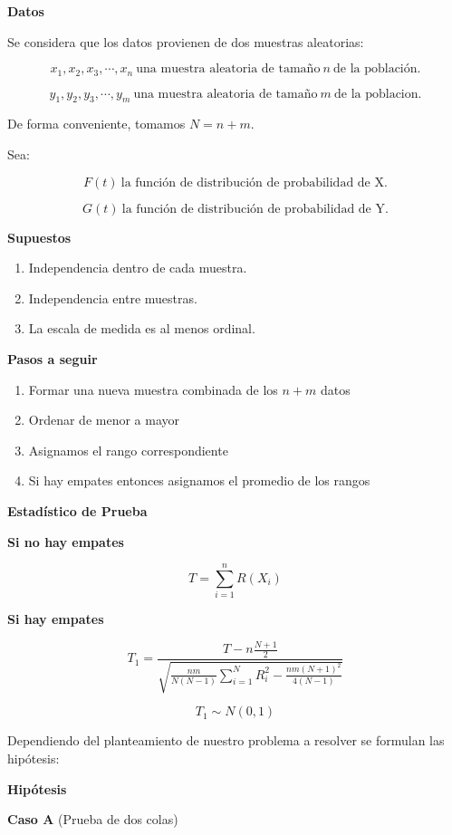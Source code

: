 \documentclass[
  a4paper,
  oneside,
  openany]{book}
\begin{document}
\textbf{Datos}

Se considera que los datos provienen de dos muestras aleatorias:

\[x_{1},x_{2},x_{3},\cdots,x_{n} \ \mbox{una muestra aleatoria de tamaño} \ n \ \mbox{de la población.}\]

\[y_{1},y_{2},y_{3},\cdots,y_{m} \ \mbox{una muestra aleatoria de tamaño} \  m \  \mbox{de la poblacion.}\]

De forma conveniente, tomamos \(N=n+m\).

Sea:

\[F(t) \ \mbox{la función de distribución de probabilidad de X.}\]

\[G(t) \ \mbox{la función de distribución de probabilidad de Y.}\]

\textbf{Supuestos}

\begin{enumerate}
\def\labelenumi{\arabic{enumi})}
\item
  Independencia dentro de cada muestra.
\item
  Independencia entre muestras.
\item
  La escala de medida es al menos ordinal.
\end{enumerate}

\textbf{Pasos a seguir}

\begin{enumerate}
\def\labelenumi{\arabic{enumi}.}
\item
  Formar una nueva muestra combinada de los \(n+m\) datos
\item
  Ordenar de menor a mayor
\item
  Asignamos el rango correspondiente
\item
  Si hay empates entonces asignamos el promedio de los rangos
\end{enumerate}

\textbf{Estadístico de Prueba}

\textbf{Si no hay empates}

\[T=\sum_{i=1}^{n}R(X_{i})\]

\textbf{Si hay empates}

\[T_1= \frac{T-n\frac{N+1}{2}}{\sqrt{\frac{nm}{N(N-1)}\sum_{i=1}^{N}R_i^2-\frac{nm(N+1)^2}{4(N-1)}}}\]

\[T_{1}\sim N(0,1)\]

Dependiendo del planteamiento de nuestro problema a resolver se formulan las hipótesis:

\textbf{Hipótesis}

\textbf{Caso A} (Prueba de dos colas)
\end{document}
